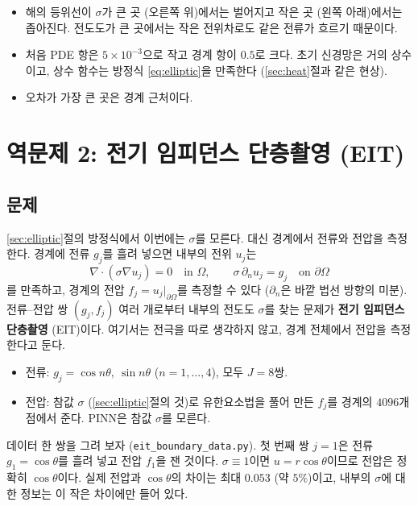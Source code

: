 \documentclass[11pt,a4paper]{article}
\begin{document}
\begin{itemize}[leftmargin=1.5em]
\item 해의 등위선이 $\sigma$가 큰 곳 (오른쪽 위)에서는 벌어지고 작은 곳 (왼쪽 아래)에서는 좁아진다. 전도도가 큰 곳에서는 작은 전위차로도 같은 전류가 흐르기 때문이다.
\item 처음 PDE 항은 $5\times10^{-3}$으로 작고 경계 항이 $0.5$로 크다. 초기 신경망은 거의 상수이고, 상수 함수는 방정식 \eqref{eq:elliptic}을 만족한다 (\ref{sec:heat}절과 같은 현상).
\item 오차가 가장 큰 곳은 경계 근처이다.
\end{itemize}

\section{역문제 2: 전기 임피던스 단층촬영 (EIT)}\label{sec:eit}

\subsection{문제}

\ref{sec:elliptic}절의 방정식에서 이번에는 $\sigma$를 모른다. 대신 경계에서 전류와 전압을 측정한다.
경계에 전류 $g_j$를 흘려 넣으면 내부의 전위 $u_j$는
\begin{equation}\label{eq:eit}
\nabla\cdot(\sigma\nabla u_j)=0\quad\text{in }\Omega,\qquad \sigma\,\partial_nu_j=g_j\quad\text{on }\partial\Omega
\end{equation}
를 만족하고, 경계의 전압 $f_j=u_j|_{\partial\Omega}$를 측정할 수 있다 ($\partial_n$은 바깥 법선 방향의 미분).
전류--전압 쌍 $(g_j,f_j)$ 여러 개로부터 내부의 전도도 $\sigma$를 찾는 문제가 \textbf{전기 임피던스 단층촬영} (EIT)이다.
여기서는 전극을 따로 생각하지 않고, 경계 전체에서 전압을 측정한다고 둔다.

\begin{itemize}[leftmargin=1.5em]
\item 전류: $g_j=\cos n\theta,\ \sin n\theta$ ($n=1,\dots,4$), 모두 $J=8$쌍.
\item 전압: 참값 $\sigma$ (\ref{sec:elliptic}절의 것)로 유한요소법을 풀어 만든 $f_j$를 경계의 $4096$개 점에서 준다. PINN은 참값 $\sigma$를 모른다.
\end{itemize}

데이터 한 쌍을 그려 보자 (\texttt{eit\_boundary\_data.py}).
첫 번째 쌍 $j=1$은 전류 $g_1=\cos\theta$를 흘려 넣고 전압 $f_1$을 잰 것이다.
$\sigma\equiv1$이면 $u=r\cos\theta$이므로 전압은 정확히 $\cos\theta$이다.
실제 전압과 $\cos\theta$의 차이는 최대 $0.053$ (약 $5\%$)이고, 내부의 $\sigma$에 대한 정보는 이 작은 차이에만 들어 있다.
\end{document}
